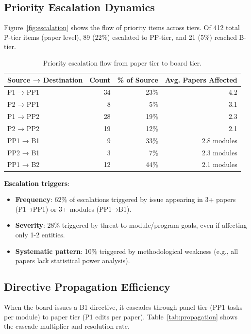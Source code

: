 \subsection{Priority Escalation Dynamics}

Figure~\ref{fig:escalation} shows the flow of priority items across tiers. Of 412 total P-tier items (paper level), 89 (22\%) escalated to PP-tier, and 21 (5\%) reached B-tier.

\begin{table}[t]
\centering
\caption{Priority escalation flow from paper tier to board tier.}
\label{tab:escalation}
\begin{tabular}{lrrr}
\toprule
Source → Destination & Count & \% of Source & Avg. Papers Affected \\
\midrule
P1 → PP1 & 34 & 23\% & 4.2 \\
P2 → PP1 & 8 & 5\% & 3.1 \\
P1 → PP2 & 28 & 19\% & 2.3 \\
P2 → PP2 & 19 & 12\% & 2.1 \\
\midrule
PP1 → B1 & 9 & 33\% & 2.8 modules \\
PP2 → B1 & 3 & 7\% & 2.3 modules \\
PP1 → B2 & 12 & 44\% & 2.1 modules \\
\bottomrule
\end{tabular}
\end{table}

\textbf{Escalation triggers}:
\begin{itemize}
\item \textbf{Frequency}: 62\% of escalations triggered by issue appearing in 3+ papers (P1→PP1) or 3+ modules (PP1→B1).
\item \textbf{Severity}: 28\% triggered by threat to module/program goals, even if affecting only 1-2 entities.
\item \textbf{Systematic pattern}: 10\% triggered by methodological weakness (e.g., all papers lack statistical power analysis).
\end{itemize}

\subsection{Directive Propagation Efficiency}

When the board issues a B1 directive, it cascades through panel tier (PP1 tasks per module) to paper tier (P1 edits per paper). Table~\ref{tab:propagation} shows the cascade multiplier and resolution rate.


